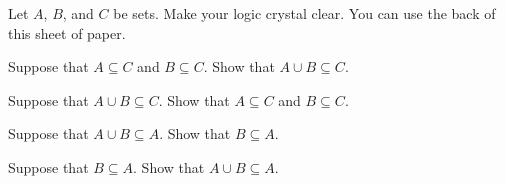 \yourname


\noindent
Let $A$, $B$, and $C$ be sets.
Make your logic crystal clear.
You can use the back of this sheet of paper.

\blist{2in}
\item Suppose that $A \subseteq C$ and $B \subseteq C$.
Show that $A \cup B \subseteq C$.

\item Suppose that $A \cup B \subseteq C$.
Show that $A \subseteq C$ and $B \subseteq C$.

\item Suppose that $A \cup B \subseteq A$.
Show that $B \subseteq A$.

\item Suppose that $B \subseteq A$.
Show that $A \cup B \subseteq A$.

\elist

\vfill          %
